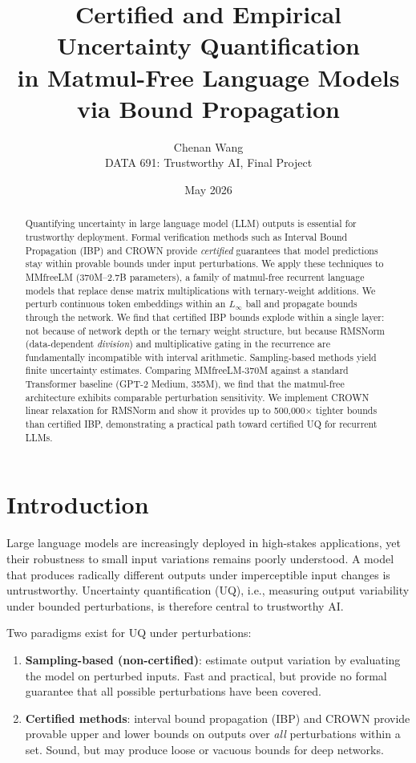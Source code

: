 \documentclass[11pt]{article}
\title{Certified and Empirical Uncertainty Quantification\\in Matmul-Free Language Models via Bound Propagation}
\author{%
    Chenan Wang \\
    DATA 691: Trustworthy AI, Final Project
}
\date{May 2026}
\begin{document}
\maketitle

\begin{abstract}
Quantifying uncertainty in large language model (LLM) outputs is essential for trustworthy deployment. Formal verification methods such as Interval Bound Propagation (IBP) and CROWN provide \emph{certified} guarantees that model predictions stay within provable bounds under input perturbations. We apply these techniques to MMfreeLM (370M--2.7B parameters), a family of matmul-free recurrent language models that replace dense matrix multiplications with ternary-weight additions. We perturb continuous token embeddings within an $L_\infty$ ball and propagate bounds through the network. We find that certified IBP bounds explode within a single layer: not because of network depth or the ternary weight structure, but because RMSNorm (data-dependent \emph{division}) and multiplicative gating in the recurrence are fundamentally incompatible with interval arithmetic. Sampling-based methods yield finite uncertainty estimates. Comparing MMfreeLM-370M against a standard Transformer baseline (GPT-2 Medium, 355M), we find that the matmul-free architecture exhibits comparable perturbation sensitivity. We implement CROWN linear relaxation for RMSNorm and show it provides up to 500,000$\times$ tighter bounds than certified IBP, demonstrating a practical path toward certified UQ for recurrent LLMs.
\end{abstract}

\section{Introduction}

Large language models are increasingly deployed in high-stakes applications, yet their robustness to small input variations remains poorly understood. A model that produces radically different outputs under imperceptible input changes is untrustworthy. Uncertainty quantification (UQ), i.e., measuring output variability under bounded perturbations, is therefore central to trustworthy AI.

Two paradigms exist for UQ under perturbations:
\begin{enumerate}[label=(\roman*)]
    \item \textbf{Sampling-based (non-certified)}: estimate output variation by evaluating the model on perturbed inputs. Fast and practical, but provide no formal guarantee that all possible perturbations have been covered.
    \item \textbf{Certified methods}: interval bound propagation (IBP) and CROWN provide provable upper and lower bounds on outputs over \emph{all} perturbations within a set. Sound, but may produce loose or vacuous bounds for deep networks.
\end{enumerate}
\end{document}

